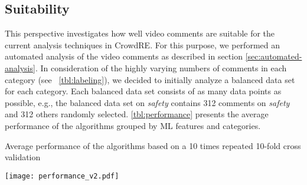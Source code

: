 \documentclass[conference]{IEEEtran}
\begin{document}
{%

\subsection{Suitability}
\label{sec:suitability}
This perspective investigates how well video comments are suitable for the current analysis techniques in CrowdRE. For this purpose, we performed an automated analysis of the video comments as described in section \ref{sec:automated-analysis}. In consideration of the highly varying numbers of comments in each category (see~\tablename{ \ref{tbl:labeling}}), we decided to initially analyze a balanced data set for each category. Each balanced data set consists of as many data points as possible, e.g., the balanced data set on \textit{safety} contains 312 comments on \textit{safety} and 312 others randomly selected. \tablename{ \ref{tbl:performance}} presents the average performance of the algorithms grouped by ML features and categories.

\begin{table}[htbp]
	\renewcommand{\arraystretch}{1.3}
	\captionsetup{justification=justified}
	\centering
	\caption{Average performance of the algorithms based on a 10 times repeated 10-fold cross validation\protect\footnotemark}
	\label{tbl:performance}
	\texttt{[image: performance\_v2.pdf]}
\end{table}

}
\end{document}
